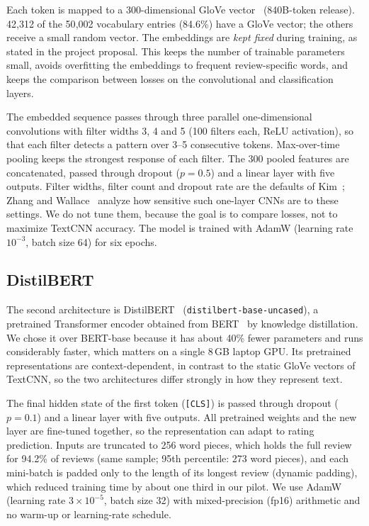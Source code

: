 Each token is mapped to a 300-dimensional GloVe vector~\cite{pennington2014} (840B-token release). 42{,}312 of the 50{,}002 vocabulary entries (84.6\%) have a GloVe vector; the others receive a small random vector. The embeddings are \emph{kept fixed} during training, as stated in the project proposal. This keeps the number of trainable parameters small, avoids overfitting the embeddings to frequent review-specific words, and keeps the comparison between losses on the convolutional and classification layers.

The embedded sequence passes through three parallel one-dimensional convolutions with filter widths 3, 4 and 5 (100 filters each, ReLU activation), so that each filter detects a pattern over 3--5 consecutive tokens. Max-over-time pooling keeps the strongest response of each filter. The 300 pooled features are concatenated, passed through dropout ($p=0.5$) and a linear layer with five outputs. Filter widths, filter count and dropout rate are the defaults of Kim~\cite{kim2014}; Zhang and Wallace~\cite{zhangwallace2017} analyze how sensitive such one-layer CNNs are to these settings. We do not tune them, because the goal is to compare losses, not to maximize TextCNN accuracy. The model is trained with AdamW (learning rate $10^{-3}$, batch size 64) for six epochs.

\subsection{DistilBERT}
\label{sec:distilbert}
The second architecture is DistilBERT~\cite{sanh2019} (\texttt{distilbert-base-uncased}), a pretrained Transformer encoder obtained from BERT~\cite{devlin2019} by knowledge distillation. We chose it over BERT-base because it has about 40\% fewer parameters and runs considerably faster, which matters on a single 8\,GB laptop GPU. Its pretrained representations are context-dependent, in contrast to the static GloVe vectors of TextCNN, so the two architectures differ strongly in how they represent text.

The final hidden state of the first token (\texttt{[CLS]}) is passed through dropout ($p=0.1$) and a linear layer with five outputs. All pretrained weights and the new layer are fine-tuned together, so the representation can adapt to rating prediction. Inputs are truncated to 256 word pieces, which holds the full review for 94.2\% of reviews (same sample; 95th percentile: 273 word pieces), and each mini-batch is padded only to the length of its longest review (dynamic padding), which reduced training time by about one third in our pilot. We use AdamW (learning rate $3\times10^{-5}$, batch size 32) with mixed-precision (fp16) arithmetic and no warm-up or learning-rate schedule.

